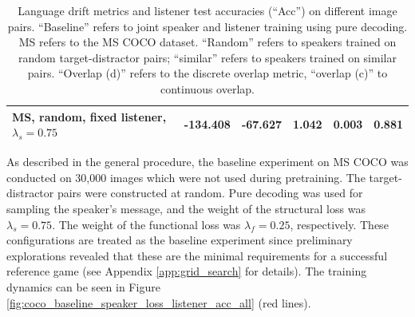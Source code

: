\begin{table}[]
\begin{tabularx}{\textwidth}{|X|l|l|X|X|X|}
		MS, random, fixed listener, $\lambda_s = 0.75$  &         -134.408          &           -67.627             &     1.042                 &        0.003              &                          0.881     \\ \hline
	\end{tabularx}
\caption{\label{tab:coco_drift_metrics_basic} Language drift metrics and listener test accuracies (``Acc'') on different image pairs. 
	``Baseline'' refers to joint speaker and listener training using pure decoding. MS refers to the MS COCO dataset. ``Random'' refers to speakers trained on random target-distractor pairs; ``similar'' refers to speakers trained on similar pairs. ``Overlap (d)'' refers to the discrete overlap metric, ``overlap (c)'' to continuous overlap.}
\end{table}

As described in the general procedure, the baseline experiment on MS COCO was conducted on 30,000 images which were not used during pretraining. The target-distractor pairs were constructed at random. Pure decoding was used for sampling the speaker's message, and the weight of the structural loss was $\lambda_s = 0.75$. The weight of the functional loss was $\lambda_f = 0.25$, respectively. These configurations are treated as the baseline experiment since preliminary explorations revealed that these are the minimal requirements for a successful reference game (see Appendix \ref{app:grid_search} for details). The training dynamics can be seen in Figure \ref{fig:coco_baseline_speaker_loss_listener_acc_all} (red lines).

